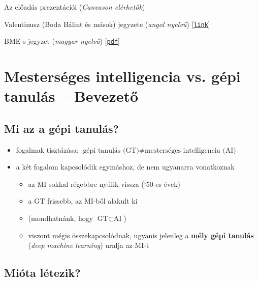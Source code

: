 \documentclass[a4paper, 11pt]{article}
\begin{document}
\begin{enumerate}[{[}1.{]}]
	\item Az előadás prezentációi (\textit{Canvason elérhetők})
	\item Valentinusz (Boda Bálint és mások) jegyzete (\textit{angol nyelvű}) [\href{https://github.com/Valentinusz/elte-ik-bsc/tree/main/5/ml/exam}{\texttt{link}}]
	\item BME-s jegyzet (\textit{magyar nyelvű}) [\href{http://mnbprogram.bme.hu/wp-content/uploads/2021/10/1_2_3_Tanulmany_MelyMegerositesesTanulasAck.pdf}{\texttt{pdf}}]
\end{enumerate}


\tableofcontents

\newpage


	
\section{Mesterséges intelligencia vs. gépi tanulás -- Bevezető}

\subsection{Mi az a gépi tanulás?}
	
\begin{itemize}
	\item fogalmak tisztázása: $\boxed{\text{gépi tanulás (GT)} \neq \text{mesterséges intelligencia (AI)}}$
	\item a két fogalom kapcsolódik egymáshoz, de nem ugyanarra vonatkoznak
	\begin{itemize}
		\item az MI sokkal régebbre nyúlik vissza (`50-es évek)
		\item a GT frissebb, az MI-ből alakult ki 
		\item (mondhatnánk, hogy $\text{GT} \subset \text{AI}$)
		\item viszont mégis összekapcsolódnak, ugyanis jelenleg a \textbf{mély gépi tanulás} (\textit{deep machine learning}) uralja az MI-t
	\end{itemize}
\end{itemize}

\subsection{Mióta létezik?}
\end{document}
